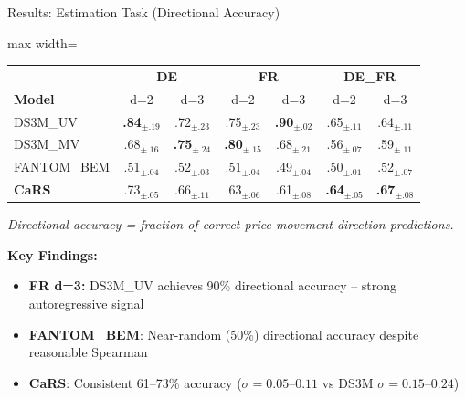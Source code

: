 \documentclass[aspectratio=169]{beamer}
\begin{document}
\begin{frame}{Results: Estimation Task (Directional Accuracy)}
\begin{table}
\centering
\small
\begin{adjustbox}{max width=\textwidth}
\begin{tabular}{l|cc|cc|cc}
\toprule
& \multicolumn{2}{c|}{\textbf{DE}} & \multicolumn{2}{c|}{\textbf{FR}} & \multicolumn{2}{c}{\textbf{DE\_FR}} \\
\textbf{Model} & d=2 & d=3 & d=2 & d=3 & d=2 & d=3 \\
\midrule
DS3M\_UV & \textbf{.84}$_{\pm.19}$ & .72$_{\pm.23}$ & .75$_{\pm.23}$ & \textbf{.90}$_{\pm.02}$ & .65$_{\pm.11}$ & .64$_{\pm.11}$ \\
DS3M\_MV & .68$_{\pm.16}$ & \textbf{.75}$_{\pm.24}$ & \textbf{.80}$_{\pm.15}$ & .68$_{\pm.21}$ & .56$_{\pm.07}$ & .59$_{\pm.11}$ \\
FANTOM\_BEM & .51$_{\pm.04}$ & .52$_{\pm.03}$ & .51$_{\pm.04}$ & .49$_{\pm.04}$ & .50$_{\pm.01}$ & .52$_{\pm.07}$ \\
\midrule
\textbf{CaRS} & .73$_{\pm.05}$ & .66$_{\pm.11}$ & .63$_{\pm.06}$ & .61$_{\pm.08}$ & \textbf{.64}$_{\pm.05}$ & \textbf{.67}$_{\pm.08}$ \\
\bottomrule
\end{tabular}
\end{adjustbox}
\end{table}

\vspace{0.2cm}
{\scriptsize \textit{Directional accuracy = fraction of correct price movement direction predictions.}} %

\vspace{0.2cm}
\textbf{Key Findings:}
\begin{itemize}
    \item \textbf{FR d=3:} DS3M\_UV achieves 90\% directional accuracy -- strong autoregressive signal
    \item \textbf{FANTOM\_BEM}: Near-random (50\%) directional accuracy despite reasonable Spearman
    \item \textbf{CaRS}: Consistent 61--73\% accuracy ($\sigma = 0.05$--$0.11$ vs DS3M $\sigma = 0.15$--$0.24$)
\end{itemize}
\end{frame}
\end{document}

